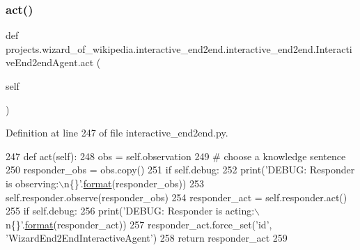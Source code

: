 \subsubsection{\texorpdfstring{act()}{act()}}
{\footnotesize\ttfamily def projects.\+wizard\+\_\+of\+\_\+wikipedia.\+interactive\+\_\+end2end.\+interactive\+\_\+end2end.\+Interactive\+End2end\+Agent.\+act (\begin{DoxyParamCaption}\item[{}]{self }\end{DoxyParamCaption})}



Definition at line 247 of file interactive\+\_\+end2end.\+py.


\begin{DoxyCode}
247     \textcolor{keyword}{def }act(self):
248         obs = self.observation
249         \textcolor{comment}{# choose a knowledge sentence}
250         responder\_obs = obs.copy()
251         \textcolor{keywordflow}{if} self.debug:
252             print(\textcolor{stringliteral}{'DEBUG: Responder is observing:\(\backslash\)n\{\}'}.\hyperlink{namespaceparlai_1_1chat__service_1_1services_1_1messenger_1_1shared__utils_a32e2e2022b824fbaf80c747160b52a76}{format}(responder\_obs))
253         self.responder.observe(responder\_obs)
254         responder\_act = self.responder.act()
255         \textcolor{keywordflow}{if} self.debug:
256             print(\textcolor{stringliteral}{'DEBUG: Responder is acting:\(\backslash\)n\{\}'}.\hyperlink{namespaceparlai_1_1chat__service_1_1services_1_1messenger_1_1shared__utils_a32e2e2022b824fbaf80c747160b52a76}{format}(responder\_act))
257         responder\_act.force\_set(\textcolor{stringliteral}{'id'}, \textcolor{stringliteral}{'WizardEnd2EndInteractiveAgent'})
258         \textcolor{keywordflow}{return} responder\_act
259 
\end{DoxyCode}
\mbox{\label{classprojects_1_1wizard__of__wikipedia_1_1interactive__end2end_1_1interactive__end2end_1_1InteractiveEnd2endAgent_a9b5b190ee1b45a7be03540894569ad5d}} 
